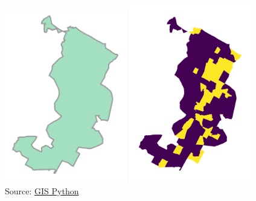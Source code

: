 \documentclass[xcolor=x11names,compress]{beamer}
\renewcommand{\(}{\begin{columns}}
\renewcommand{\)}{\end{columns}}
\newcommand{\<}[1]{\begin{column}{#1}}
\renewcommand{\>}{\end{column}}
\begin{document}
\begin{frame}
\begin{columns}[T]
\begin{column}{0.5\textwidth}
\begin{itemize}
{             \includegraphics[width=0.4\textwidth]{AreaGISInformation3.png}
             \includegraphics[width=0.4\textwidth]{AreaGISInformation4.png} \\
              \textcolor{gris}{\footnotesize{Source:
             \href{https://pythongis.org/part2/chapter-06/nb/02-geometric-operations.html}{GIS Python}}} \\  }
\end{itemize}
\end{column}
\end{columns}
\end{frame}
\end{document}
